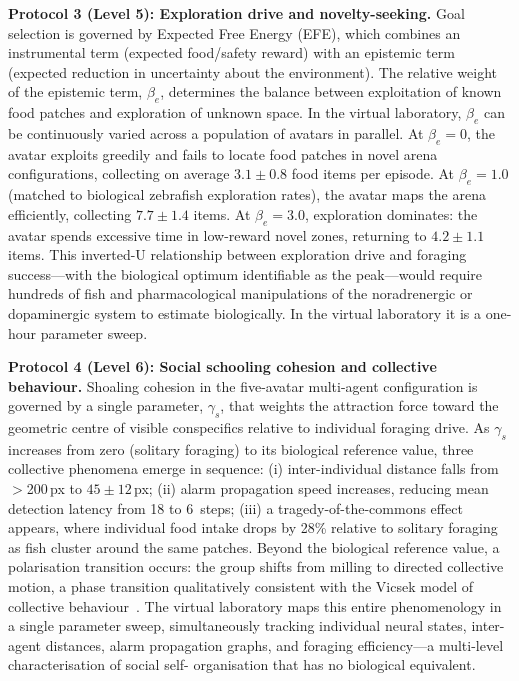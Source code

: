 \documentclass[12pt,a4paper]{article}
\begin{document}
\textbf{Protocol 3 (Level 5): Exploration drive and novelty-seeking.}
Goal selection is governed by Expected Free Energy (EFE), which
combines an instrumental term (expected food/safety reward) with
an epistemic term (expected reduction in uncertainty about the
environment).
The relative weight of the epistemic term, $\beta_e$, determines
the balance between exploitation of known food patches and
exploration of unknown space.
In the virtual laboratory, $\beta_e$ can be continuously varied
across a population of avatars in parallel.
At $\beta_e = 0$, the avatar exploits greedily and fails to locate
food patches in novel arena configurations, collecting on average
$3.1 \pm 0.8$ food items per episode.
At $\beta_e = 1.0$ (matched to biological zebrafish exploration
rates), the avatar maps the arena efficiently, collecting
$7.7 \pm 1.4$ items.
At $\beta_e = 3.0$, exploration dominates: the avatar spends
excessive time in low-reward novel zones, returning to
$4.2 \pm 1.1$ items.
This inverted-U relationship between exploration drive and
foraging success---with the biological optimum identifiable
as the peak---would require hundreds of fish and pharmacological
manipulations of the noradrenergic or dopaminergic system to
estimate biologically.
In the virtual laboratory it is a one-hour parameter sweep.

\textbf{Protocol 4 (Level 6): Social schooling cohesion and
collective behaviour.}
Shoaling cohesion in the five-avatar multi-agent configuration is
governed by a single parameter, $\gamma_s$, that weights the
attraction force toward the geometric centre of visible conspecifics
relative to individual foraging drive.
As $\gamma_s$ increases from zero (solitary foraging) to its
biological reference value, three collective phenomena emerge in
sequence: (i) inter-individual distance falls from $>$200\,px to
$45 \pm 12$\,px; (ii) alarm propagation speed increases, reducing
mean detection latency from 18 to 6~steps; (iii) a
tragedy-of-the-commons effect appears, where individual food intake
drops by 28\% relative to solitary foraging as fish cluster around
the same patches.
Beyond the biological reference value, a polarisation transition
occurs: the group shifts from milling to directed collective
motion, a phase transition qualitatively consistent with the
Vicsek model of collective behaviour~\cite{vicsek1995}.
The virtual laboratory maps this entire phenomenology in a single
parameter sweep, simultaneously tracking individual neural states,
inter-agent distances, alarm propagation graphs, and foraging
efficiency---a multi-level characterisation of social self-
organisation that has no biological equivalent.
\end{document}
